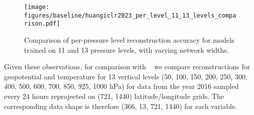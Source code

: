 \begin{figure}[h]
\centering
\texttt{[image: figures/baseline/huangiclr2023\_per\_level\_11\_13\_levels\_comparison.pdf]}
\caption{Comparison of per-pressure level reconstruction accuracy for models trained on 11 and 13 pressure levels, with varying network widths.}
\label{fig:huangiclr2023_per_level_11_13_levels_comparison}
\end{figure}

Given these observations, for comparison with ~\cite{huang2022compressing} we compare reconstructions for geopotential and temperature for 13 vertical levels  (50, 100, 150, 200, 250, 300, 400, 500, 600, 700, 850, 925, 1000 hPa) for data from the year 2016 sampled every 24 hours reprojected on (721, 1440) latitude/longitude grids. The corresponding data shape is therefore (366, 13, 721, 1440) for each variable.